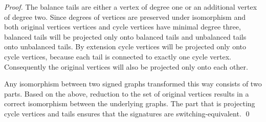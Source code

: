 \textit{Proof.} The balance tails are either a vertex of degree one or an additional vertex of degree two. Since degrees of vertices are preserved under isomorphism and both original vertices vertices and cycle vertices have minimal degree three, balanced tails will be projected only onto balanced tails and unbalanced tails onto unbalanced tails. By extension cycle vertices will be projected only onto cycle vertices, because each tail is connected to exactly one cycle vertex. Consequently the original vertices will also be projected only onto each other.

Any isomorphism between two signed graphs transformed this way consists of two parts. Based on the above, reduction to the set of original vertices results in a correct isomorphism between the underlying graphs. The part that is projecting cycle vertices and tails ensures that the signatures are switching-equivalent. \qed


